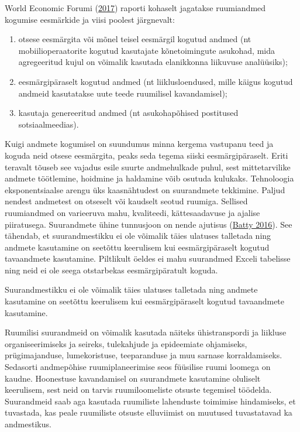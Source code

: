 \documentclass[estonian,]{article}
\providecommand{\tightlist}{%
  \setlength{\itemsep}{0pt}\setlength{\parskip}{0pt}}
\begin{document}
World Economic Forumi (\protect\hyperlink{World2017}{2017}) raporti kohaselt jagatakse ruumiandmed kogumise eesmärkide ja viisi poolest järgnevalt:

\begin{enumerate}
\def\labelenumi{\arabic{enumi})}
\tightlist
\item
  otsese eesmärgita või mõnel teisel eesmärgil kogutud andmed (nt mobiilioperaatorite kogutud kasutajate kõnetoimingute asukohad, mida agregeeritud kujul on võimalik kasutada elanikkonna liikuvuse analüüsiks);
\item
  eesmärgipäraselt kogutud andmed (nt liiklusloendused, mille käigus kogutud andmeid kasutatakse uute teede ruumilisel kavandamisel);
\item
  kasutaja genereeritud andmed (nt asukohapõhised postitused sotsiaalmeedias).
\end{enumerate}

Kuigi andmete kogumisel on suundumus minna kergema vastupanu teed ja koguda neid otsese eesmärgita, peaks seda tegema siiski eesmärgipäraselt. Eriti teravalt tõuseb see vajadus esile suurte andmehulkade puhul, sest mittetarvilike andmete töötlemine, hoidmine ja haldamine võib osutuda kulukaks. Tehnoloogia eksponentsiaalse arengu üks kaasnähtudest on suurandmete tekkimine. Paljud nendest andmetest on otseselt või kaudselt seotud ruumiga. Sellised ruumiandmed on varieeruva mahu, kvaliteedi, kättesaadavuse ja ajalise piiratusega. Suurandmete ühine tunnusjoon on nende ajutisus (\protect\hyperlink{Batty2016}{Batty 2016}). See tähendab, et suurandmestikku ei ole võimalik täies ulatuses talletada ning andmete kasutamine on seetõttu keerulisem kui eesmärgipäraselt kogutud tavaandmete kasutamine. Piltlikult öeldes ei mahu suurandmed Exceli tabelisse ning neid ei ole seega otstarbekas eesmärgipäratult koguda.

\begin{blockquote-right}
Suurandmestikku ei ole võimalik täies ulatuses talletada ning andmete
kasutamine on seetõttu keerulisem kui eesmärgipäraselt kogutud
tavaandmete kasutamine.
\end{blockquote-right}

Ruumilisi suurandmeid on võimalik kasutada näiteks ühistranspordi ja liikluse organiseerimiseks ja seireks, tulekahjude ja epideemiate ohjamiseks, prügimajanduse, lumekoristuse, teeparanduse ja muu sarnase korraldamiseks. Sedasorti andmepõhise ruumiplaneerimise seos füüsilise ruumi loomega on kaudne. Hoonestuse kavandamisel on suurandmete kasutamine oluliselt keerulisem, sest neid on tarvis ruumiloomeliste otsuste tegemisel töödelda. Suurandmeid saab aga kasutada ruumiliste lahenduste toimimise hindamiseks, et tuvastada, kas peale ruumiliste otsuste elluviimist on muutused tuvastatavad ka andmestikus.
\end{document}
